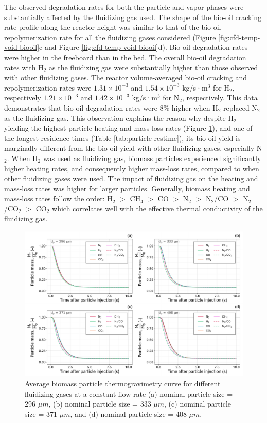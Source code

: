 \documentclass{article}
\begin{document}
The observed degradation rates for both the particle and vapor phases were substantially affected by the fluidizing gas used. The shape of the bio-oil cracking rate profile along the reactor height was similar to that of the bio-oil repolymerization rate for all the fluidizing gases considered (Figure \ref{fig:cfd-temp-void-biooil}c and Figure \ref{fig:cfd-temp-void-biooil}d). Bio-oil degradation rates were higher in the freeboard than in the bed. The overall bio-oil degradation rates with H$_2$ as the fluidizing gas were substantially higher than those observed with other fluidizing gases. The reactor volume-averaged bio-oil cracking and repolymerization rates were $1.31\times10^{-3}$ and $1.54\times10^{-3}$ kg/s·m$^3$ for H$_2$, respectively $1.21\times10^{-3}$ and $1.42\times10^{-3}$ kg/s·m$^3$ for N$_2$, respectively. This data demonstrates that bio-oil degradation rates were 8\% higher when H$_2$ replaced N$_2$ as the fluidizing gas. This observation explains the reason why despite H$_2$ yielding the highest particle heating and mass-loss rates (Figure \ref{fig:cfd-masspercent}), and one of the longest residence times (Table \ref{tab:particle-restime}), its bio-oil yield is marginally different from the bio-oil yield with other fluidizing gases, especially N$_2$. When H$_2$ was used as fluidizing gas, biomass particles experienced significantly higher heating rates, and consequently higher mass-loss rates, compared to when other fluidizing gases were used. The impact of fluidizing gas on the heating and mass-loss rates was higher for larger particles. Generally, biomass heating and mass-loss rates follow the order: H$_2$ $>$ CH$_4$ $>$ CO $>$ N$_2$ $>$ N$_2$/CO $>$ N$_2$/CO$_2$ $>$ CO$_2$ which correlates well with the effective thermal conductivity of the fluidizing gas.

\begin{figure}[H]
    \centering
    \includegraphics[width=1.0\textwidth]{figures/cfd-masspercent.pdf}
    \caption{Average biomass particle thermogravimetry curve for different fluidizing gases at a constant flow rate (a) nominal particle size = 296 $\mu m$, (b) nominal particle size = 333 $\mu m$, (c) nominal particle size = 371 $\mu m$, and (d) nominal particle size = 408 $\mu m$.}
    \label{fig:cfd-masspercent}
\end{figure}
\end{document}
